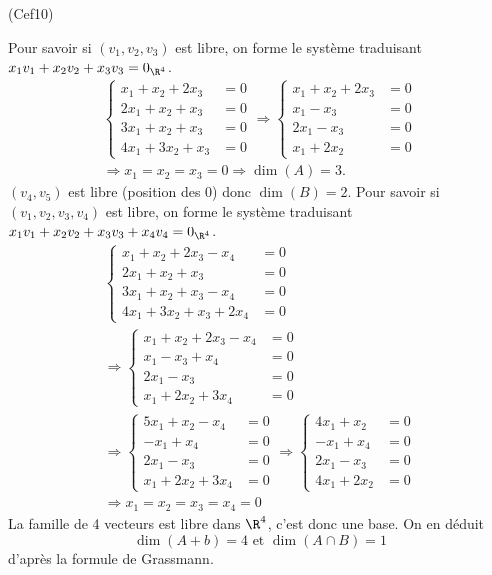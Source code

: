 \begin{tiny}(Cef10)\end{tiny} Pour savoir si $(v_1,v_2,v_3)$ est libre, on forme le système traduisant $x_1 v_1 + x_2v_2 + x_3 v_3 = 0_{\R^4}$.
\begin{multline*}
 \left\lbrace
 \begin{aligned}
  x_1 + x_2 + 2x_3 &= 0 \\
  2x_1 + x_2 + x_3 &= 0 \\
  3x_1 + x_2 + x_3 &= 0 \\
  4x_1 + 3x_2 + x_3 &= 0
 \end{aligned}
\right. 
\Rightarrow
 \left\lbrace
 \begin{aligned}
  x_1 + x_2 + 2x_3 &= 0 \\
  x_1  - x_3 &= 0 \\
  2x_1 - x_3 &= 0 \\
  x_1 + 2x_2  &= 0
 \end{aligned}
\right. \\
\Rightarrow x_1 = x_2 = x_3 = 0
\Rightarrow \dim(A) = 3.
\end{multline*}
$(v_4,v_5)$ est libre (position des $0$) donc $\dim(B) = 2$.\newline
Pour savoir si $(v_1,v_2,v_3,v_4)$ est libre, on forme le système traduisant $x_1 v_1 + x_2v_2 + x_3 v_3 + x_4v_4= 0_{\R^4}$.
\begin{multline*}
 \left\lbrace
 \begin{aligned}
  x_1 + x_2 + 2x_3 - x_4 &= 0 \\
  2x_1 + x_2 + x_3 &= 0 \\
  3x_1 + x_2 + x_3 -x_4 &= 0 \\
  4x_1 + 3x_2 + x_3 + 2x_4 &= 0
 \end{aligned}
\right. \\
\Rightarrow
 \left\lbrace
 \begin{aligned}
  x_1 + x_2 + 2x_3 - x_4 &= 0 \\
  x_1  - x_3 + x_4 &= 0 \\
  2x_1 - x_3 &= 0 \\
  x_1 + 2x_2 + 3x_4 &= 0
 \end{aligned}
\right. \\
\Rightarrow
 \left\lbrace
 \begin{aligned}
  5x_1 + x_2  - x_4 &= 0 \\
  -x_1   + x_4 &= 0 \\
  2x_1 - x_3 &= 0 \\
  x_1 + 2x_2 + 3x_4 &= 0
 \end{aligned}
\right. 
\Rightarrow
 \left\lbrace
 \begin{aligned}
  4x_1 + x_2   &= 0 \\
  -x_1   + x_4 &= 0 \\
  2x_1 - x_3 &= 0 \\
  4x_1 + 2x_2 &= 0
 \end{aligned}
\right. \\
\Rightarrow x_1 = x_2 = x_3 = x_4 = 0
\end{multline*}
La famille de 4 vecteurs est libre dans $\R^4$, c'est donc une base. On en déduit
\[
 \dim(A+b) = 4 \text{ et } \dim(A \cap B) = 1
\]
d'après la formule de Grassmann.
